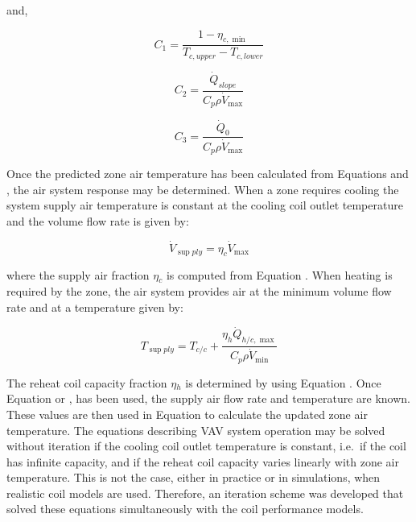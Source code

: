 and,

\begin{equation}
{C_1} = \frac{{1 - {\eta_{c,\min }}}}{{{T_{c,upper}} - {T_{c,lower}}}}
\end{equation}

\begin{equation}
{C_2} = \frac{{{{\dot Q}_{slope}}}}{{{C_p}\rho {{\dot V}_{\max }}}}
\end{equation}

\begin{equation}
{C_3} = \frac{{{{\dot Q}_0}}}{{{C_p}\rho {{\dot V}_{\max }}}}
\end{equation}

Once the predicted zone air temperature has been calculated from Equations and , the air system response may be determined. When a zone requires cooling the system supply air temperature is constant at the cooling coil outlet temperature and the volume flow rate is given by:

\begin{equation}
{\dot V_{\sup ply}} = {\eta_c}{\dot V_{\max }}
\end{equation}

where the supply air fraction $\eta$\(_{c}\) is computed from Equation . When heating is required by the zone, the air system provides air at the minimum volume flow rate and at a temperature given by:

\begin{equation}
{T_{\sup ply}} = {T_{c/c}} + \frac{{{\eta_h}{{\dot Q}_{h/c,\max }}}}{{{C_p}\rho {{\dot V}_{\min }}}}
\end{equation}

The reheat coil capacity fraction $\eta$\(_{h}\) is determined by using Equation . Once Equation or , has been used, the supply air flow rate and temperature are known. These values are then used in Equation to calculate the updated zone air temperature. The equations describing VAV system operation may be solved without iteration if the cooling coil outlet temperature is constant, i.e.~if the coil has infinite capacity, and if the reheat coil capacity varies linearly with zone air temperature. This is not the case, either in practice or in simulations, when realistic coil models are used. Therefore, an iteration scheme was developed that solved these equations simultaneously with the coil performance models.
